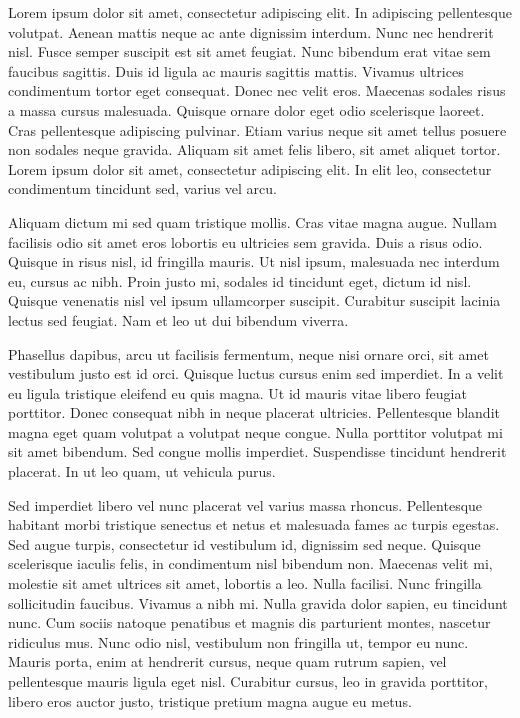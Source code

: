 Lorem ipsum dolor sit amet, consectetur adipiscing elit. In adipiscing pellentesque volutpat. Aenean mattis neque ac ante dignissim interdum. Nunc nec hendrerit nisl. Fusce semper suscipit est sit amet feugiat. Nunc bibendum erat vitae sem faucibus sagittis. Duis id ligula ac mauris sagittis mattis. Vivamus ultrices condimentum tortor eget consequat. Donec nec velit eros. Maecenas sodales risus a massa cursus malesuada. Quisque ornare dolor eget odio scelerisque laoreet. Cras pellentesque adipiscing pulvinar. Etiam varius neque sit amet tellus posuere non sodales neque gravida. Aliquam sit amet felis libero, sit amet aliquet tortor. Lorem ipsum dolor sit amet, consectetur adipiscing elit. In elit leo, consectetur condimentum tincidunt sed, varius vel arcu.

Aliquam dictum mi sed quam tristique mollis. Cras vitae magna augue. Nullam facilisis odio sit amet eros lobortis eu ultricies sem gravida. Duis a risus odio. Quisque in risus nisl, id fringilla mauris. Ut nisl ipsum, malesuada nec interdum eu, cursus ac nibh. Proin justo mi, sodales id tincidunt eget, dictum id nisl. Quisque venenatis nisl vel ipsum ullamcorper suscipit. Curabitur suscipit lacinia lectus sed feugiat. Nam et leo ut dui bibendum viverra.

Phasellus dapibus, arcu ut facilisis fermentum, neque nisi ornare orci, sit amet vestibulum justo est id orci. Quisque luctus cursus enim sed imperdiet. In a velit eu ligula tristique eleifend eu quis magna. Ut id mauris vitae libero feugiat porttitor. Donec consequat nibh in neque placerat ultricies. Pellentesque blandit magna eget quam volutpat a volutpat neque congue. Nulla porttitor volutpat mi sit amet bibendum. Sed congue mollis imperdiet. Suspendisse tincidunt hendrerit placerat. In ut leo quam, ut vehicula purus.

Sed imperdiet libero vel nunc placerat vel varius massa rhoncus. Pellentesque habitant morbi tristique senectus et netus et malesuada fames ac turpis egestas. Sed augue turpis, consectetur id vestibulum id, dignissim sed neque. Quisque scelerisque iaculis felis, in condimentum nisl bibendum non. Maecenas velit mi, molestie sit amet ultrices sit amet, lobortis a leo. Nulla facilisi. Nunc fringilla sollicitudin faucibus. Vivamus a nibh mi. Nulla gravida dolor sapien, eu tincidunt nunc. Cum sociis natoque penatibus et magnis dis parturient montes, nascetur ridiculus mus. Nunc odio nisl, vestibulum non fringilla ut, tempor eu nunc. Mauris porta, enim at hendrerit cursus, neque quam rutrum sapien, vel pellentesque mauris ligula eget nisl. Curabitur cursus, leo in gravida porttitor, libero eros auctor justo, tristique pretium magna augue eu metus.